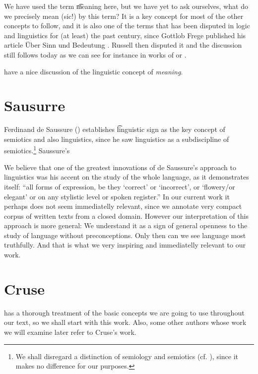 We have used the term \t{meaning} here, but we have yet to ask ourselves, what do we precisely mean (sic!) by this term? It is a key concept for most of the other concepts to follow, and it is also one of the terms that has been disputed in logic and linguistics for (at least) the past century, since Gottlob Frege published his article Über Sinn und Bedeutung \citep{frege:1892}. Russell then disputed it and the discussion still follows today as we can see for instance in works of \citet{tichy:1978} or \citet{materna:1998}.

\citet{sgall-etal:1986} have a nice discussion of the linguistic concept of \emph{meaning}.   


\section{Sausurre}
Ferdinand de Saussure (\citeyear{saussure:2006}) establishes \t{linguistic sign} as the key concept of semiotics and also linguistics, since he saw linguistics as a subdiscipline of semiotics.\footnote{We shall disregard a distinction of semiology and semiotics (cf. \citealp{tobin:1990}), since it makes no difference for our purposes.} Saussure's 

We believe that one of the greatest innovations of de Saussure's approach to linguistics was his accent on the study of the whole language, as it demonstrates itself: ``all forms of expression, be they `correct' or `incorrect', or `flowery/or elegant' or on any stylistic level or spoken register.'' \citep{tobin:1990} In our current work it perhaps does not seem immediatelly relevant, since we annotate very compact corpus of written texts from a closed domain. However our interpretation of this approach is more general: We understand it as a sign of general openness to the study of language without preconceptions. Only then can we see language most truthfully. And that is what we very inspiring and immediatelly relevant to our work.


\section{Cruse}
\label{rel:cruse}
\citetext{D. A. Cruse in his book \emph{Lexical Semantics}, \citeyear{cruse:1986}} has a thorough treatment of the basic concepts we are going to use throughout our text, so we shall start with this work. Also, some other authors whose work we will examine later refer to Cruse's work. 

